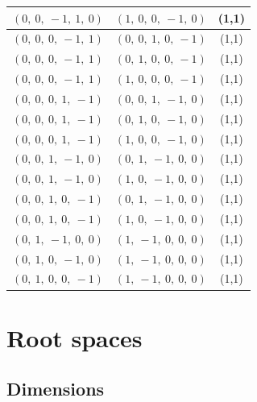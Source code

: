 \documentclass[11pt]{article}
\theoremstyle{definition}
\begin{document}
\begin{longtable}{|l|l|c|}
    \hline
    $\left( 0, \  0, \  -1, \  1, \  0\right)$ & $\left( 1, \  0, \  0, \  -1, \  0\right)$ & (1,1) \\
    \hline
    $\left( 0, \  0, \  0, \  -1, \  1\right)$ & $\left( 0, \  0, \  1, \  0, \  -1\right)$ & (1,1) \\
    \hline
    $\left( 0, \  0, \  0, \  -1, \  1\right)$ & $\left( 0, \  1, \  0, \  0, \  -1\right)$ & (1,1) \\
    \hline
    $\left( 0, \  0, \  0, \  -1, \  1\right)$ & $\left( 1, \  0, \  0, \  0, \  -1\right)$ & (1,1) \\
    \hline
    $\left( 0, \  0, \  0, \  1, \  -1\right)$ & $\left( 0, \  0, \  1, \  -1, \  0\right)$ & (1,1) \\
    \hline
    $\left( 0, \  0, \  0, \  1, \  -1\right)$ & $\left( 0, \  1, \  0, \  -1, \  0\right)$ & (1,1) \\
    \hline
    $\left( 0, \  0, \  0, \  1, \  -1\right)$ & $\left( 1, \  0, \  0, \  -1, \  0\right)$ & (1,1) \\
    \hline
    $\left( 0, \  0, \  1, \  -1, \  0\right)$ & $\left( 0, \  1, \  -1, \  0, \  0\right)$ & (1,1) \\
    \hline
    $\left( 0, \  0, \  1, \  -1, \  0\right)$ & $\left( 1, \  0, \  -1, \  0, \  0\right)$ & (1,1) \\
    \hline
    $\left( 0, \  0, \  1, \  0, \  -1\right)$ & $\left( 0, \  1, \  -1, \  0, \  0\right)$ & (1,1) \\
    \hline
    $\left( 0, \  0, \  1, \  0, \  -1\right)$ & $\left( 1, \  0, \  -1, \  0, \  0\right)$ & (1,1) \\
    \hline
    $\left( 0, \  1, \  -1, \  0, \  0\right)$ & $\left( 1, \  -1, \  0, \  0, \  0\right)$ & (1,1) \\
    \hline
    $\left( 0, \  1, \  0, \  -1, \  0\right)$ & $\left( 1, \  -1, \  0, \  0, \  0\right)$ & (1,1) \\
    \hline
    $\left( 0, \  1, \  0, \  0, \  -1\right)$ & $\left( 1, \  -1, \  0, \  0, \  0\right)$ & (1,1) \\
    \hline
\end{longtable}

\fi

\newpage
\section{Root spaces}

\subsection{Dimensions}
\end{document}
